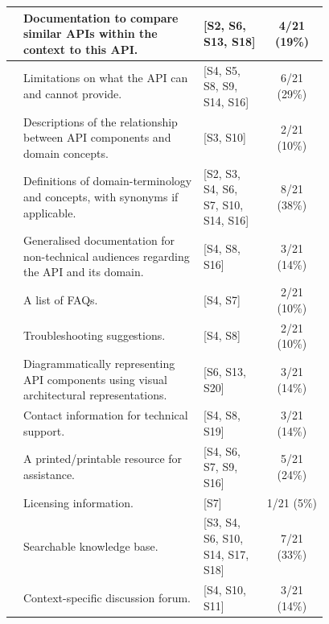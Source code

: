 \begin{table}[hbt]
\begin{tabular}{|rp{0.58\linewidth}||p{0.2\linewidth}|c|}
    \hline
    [B6]&
    Documentation to compare similar APIs within the context to this API.
    &
    [S2, S6, S13, S18] &
    4/21 (19\%)\\

    \hline
    [B7]&
    Limitations on what the API can and cannot provide.
    &
    [S4, S5, S8, S9, S14, S16] &
    6/21 (29\%)\\

    \hline
    \hline
    [C1]&
    Descriptions of the relationship between API components and domain concepts.
    &
    [S3, S10] &
    2/21 (10\%)\\

    \hline
    [C2]&
    Definitions of domain-terminology and concepts, with synonyms if applicable.
    &
    [S2, S3, S4, S6, S7, S10, S14, S16] &
    8/21 (38\%)\\

    \hline
    [C3]&
    Generalised documentation for non-technical audiences regarding the API and its domain.
    &
    [S4, S8, S16] &
    3/21 (14\%)\\

    \hline
    \hline
    [D1]&
    A list of FAQs.
    &
    [S4, S7] &
    2/21 (10\%)\\

    \hline
    [D2]&
    Troubleshooting suggestions.
    &
    [S4, S8] &
    2/21 (10\%)\\

    \hline
    [D3]&
    Diagrammatically representing API components using visual architectural representations.
    &
    [S6, S13, S20] &
    3/21 (14\%)\\

    \hline
    [D4]&
    Contact information for technical support.
    &
    [S4, S8, S19] &
    3/21 (14\%)\\

    \hline
    [D5]&
    A printed/printable resource for assistance.
    &
    [S4, S6, S7, S9, S16] &
    5/21 (24\%)\\

    \hline
    [D6]&
    Licensing information.
    &
    [S7] &
    1/21 (5\%)\\

    \hline
    \hline
    [E1]&
    Searchable knowledge base.
    &
    [S3, S4, S6, S10, S14, S17, S18] &
    7/21 (33\%)\\

    \hline
    [E2]&
    Context-specific discussion forum.
    &
    [S4, S10, S11] &
    3/21 (14\%)\\


\end{tabular}
\end{table}
